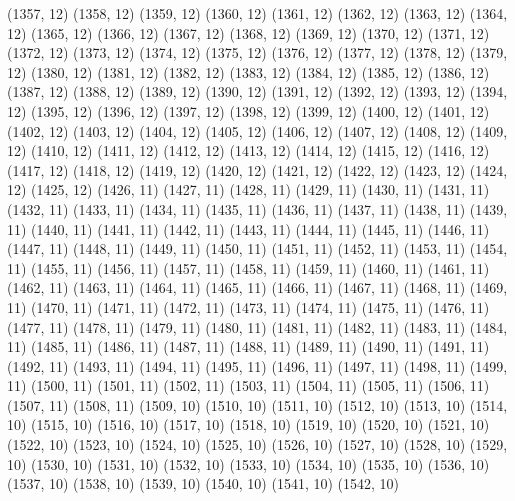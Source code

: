 {   (1357, 12)
   (1358, 12)
   (1359, 12)
   (1360, 12)
   (1361, 12)
   (1362, 12)
   (1363, 12)
   (1364, 12)
   (1365, 12)
   (1366, 12)
   (1367, 12)
   (1368, 12)
   (1369, 12)
   (1370, 12)
   (1371, 12)
   (1372, 12)
   (1373, 12)
   (1374, 12)
   (1375, 12)
   (1376, 12)
   (1377, 12)
   (1378, 12)
   (1379, 12)
   (1380, 12)
   (1381, 12)
   (1382, 12)
   (1383, 12)
   (1384, 12)
   (1385, 12)
   (1386, 12)
   (1387, 12)
   (1388, 12)
   (1389, 12)
   (1390, 12)
   (1391, 12)
   (1392, 12)
   (1393, 12)
   (1394, 12)
   (1395, 12)
   (1396, 12)
   (1397, 12)
   (1398, 12)
   (1399, 12)
   (1400, 12)
   (1401, 12)
   (1402, 12)
   (1403, 12)
   (1404, 12)
   (1405, 12)
   (1406, 12)
   (1407, 12)
   (1408, 12)
   (1409, 12)
   (1410, 12)
   (1411, 12)
   (1412, 12)
   (1413, 12)
   (1414, 12)
   (1415, 12)
   (1416, 12)
   (1417, 12)
   (1418, 12)
   (1419, 12)
   (1420, 12)
   (1421, 12)
   (1422, 12)
   (1423, 12)
   (1424, 12)
   (1425, 12)
   (1426, 11)
   (1427, 11)
   (1428, 11)
   (1429, 11)
   (1430, 11)
   (1431, 11)
   (1432, 11)
   (1433, 11)
   (1434, 11)
   (1435, 11)
   (1436, 11)
   (1437, 11)
   (1438, 11)
   (1439, 11)
   (1440, 11)
   (1441, 11)
   (1442, 11)
   (1443, 11)
   (1444, 11)
   (1445, 11)
   (1446, 11)
   (1447, 11)
   (1448, 11)
   (1449, 11)
   (1450, 11)
   (1451, 11)
   (1452, 11)
   (1453, 11)
   (1454, 11)
   (1455, 11)
   (1456, 11)
   (1457, 11)
   (1458, 11)
   (1459, 11)
   (1460, 11)
   (1461, 11)
   (1462, 11)
   (1463, 11)
   (1464, 11)
   (1465, 11)
   (1466, 11)
   (1467, 11)
   (1468, 11)
   (1469, 11)
   (1470, 11)
   (1471, 11)
   (1472, 11)
   (1473, 11)
   (1474, 11)
   (1475, 11)
   (1476, 11)
   (1477, 11)
   (1478, 11)
   (1479, 11)
   (1480, 11)
   (1481, 11)
   (1482, 11)
   (1483, 11)
   (1484, 11)
   (1485, 11)
   (1486, 11)
   (1487, 11)
   (1488, 11)
   (1489, 11)
   (1490, 11)
   (1491, 11)
   (1492, 11)
   (1493, 11)
   (1494, 11)
   (1495, 11)
   (1496, 11)
   (1497, 11)
   (1498, 11)
   (1499, 11)
   (1500, 11)
   (1501, 11)
   (1502, 11)
   (1503, 11)
   (1504, 11)
   (1505, 11)
   (1506, 11)
   (1507, 11)
   (1508, 11)
   (1509, 10)
   (1510, 10)
   (1511, 10)
   (1512, 10)
   (1513, 10)
   (1514, 10)
   (1515, 10)
   (1516, 10)
   (1517, 10)
   (1518, 10)
   (1519, 10)
   (1520, 10)
   (1521, 10)
   (1522, 10)
   (1523, 10)
   (1524, 10)
   (1525, 10)
   (1526, 10)
   (1527, 10)
   (1528, 10)
   (1529, 10)
   (1530, 10)
   (1531, 10)
   (1532, 10)
   (1533, 10)
   (1534, 10)
   (1535, 10)
   (1536, 10)
   (1537, 10)
   (1538, 10)
   (1539, 10)
   (1540, 10)
   (1541, 10)
   (1542, 10)
}
